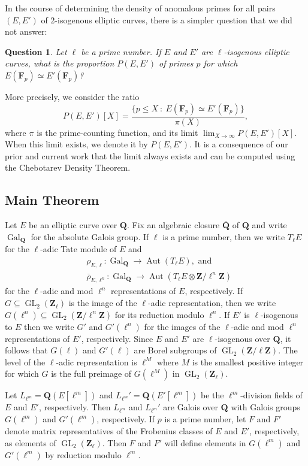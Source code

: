 \documentclass{amsart}
\newcommand{\Gal}{\operatorname{Gal}}
\newcommand{\Aut}{\operatorname{Aut}}
\newcommand{\Zl}{\mathbf{Z}_{\ell}}
\newcommand{\Z}{\mathbf{Z}}
\newcommand{\F}{\mathbf{F}}
\newcommand{\Q}{\mathbf{Q}}
\newcommand{\GL}{\operatorname{GL}}
\numberwithin{equation}{section}
\theoremstyle{plain}
\newtheorem{qu}{Question}
\theoremstyle{remark}
\begin{document}
In the course of determining the density of anomalous primes for all pairs $(E,E')$ of 2-isogenous elliptic curves, there is a simpler question that we did not answer:

\begin{qu}
Let $\ell$ be a prime number.  If $E$ and $E'$ are $\ell$-isogenous elliptic curves, what is the proportion $P(E,E')$ of primes $p$ for which $E(\F_p) \simeq E'(\F_p)$?
\end{qu}

More precisely, we consider the ratio
\[
P(E,E')[X] = \frac{\lbrace p \leq X~:~ E(\F_p) \simeq E'(\F_p) \rbrace}{\pi(X)},
\]
where $\pi$ is the prime-counting function, and its limit $\lim_{X \to \infty} P(E,E')[X]$.  When this limit exists, we denote it by $P(E,E')$.   It is a consequence of our prior and current work that the limit always exists and can be computed using the Chebotarev Density Theorem. 

\subsection{Main Theorem} Let $E$ be an elliptic curve over $\Q$.  Fix an algebraic closure $\overline{\Q}$ of $\Q$ and write $\Gal_\Q$ for the absolute Galois group.  If $\ell$ is a prime number, then we write $T_\ell E$ for the $\ell$-adic Tate module of $E$ and 
\begin{align*}
&\rho_{E,\ell}: \Gal_\Q \to \Aut (T_\ell E), \text{ and} \\
&\overline{\rho}_{E,\ell^n}: \Gal_\Q \to \Aut (T_\ell E \otimes \Z/\ell^n\Z) 
\end{align*}
for the $\ell$-adic and mod $\ell^n$ representations of $E$, respectively.  If $G \subseteq \GL_2(\Zl)$ is the image of the $\ell$-adic representation, then we write $G(\ell^n) \subseteq \GL_2(\Z/\ell^n\Z)$ for its reduction modulo $\ell^n$. If $E'$ is $\ell$-isogenous to $E$ then we write  $G'$ and $G'(\ell^n)$ for the images of the $\ell$-adic and mod $\ell^n$ representations of $E'$, respectively.  Since $E$ and $E'$ are $\ell$-isogenous over $\Q$, it follows that $G(\ell)$ and $G'(\ell)$ are Borel subgroups of $\GL_2(\Z/\ell\Z)$.  The level  of the $\ell$-adic representation is $\ell^M$ where $M$ is the smallest positive integer for which $G$ is the full preimage of $G(\ell^M)$ in $\GL_2(\Z_\ell)$.

Let $L_{\ell^m} = \Q(E[\ell^m])$ and  $L_{\ell^m}' = \Q(E'[\ell^m])$ be the $\ell^m$-division fields of $E$ and $E'$, respectively.  Then $L_{\ell^m}$ and $L_{\ell^m}'$ are Galois over $\Q$ with Galois groups $G(\ell^m)$ and $G'(\ell^m)$, respectively.   If $p$ is a prime number, let $F$ and $F'$ denote matrix representatives of the Frobenius classes of $E$ and $E'$, respectively, as elements of $\GL_2(\Zl)$.  Then $F$ and $F'$ will define elements in $G(\ell^m)$ and $G'(\ell^m)$ by reduction modulo $\ell^m$. 
\end{document}
